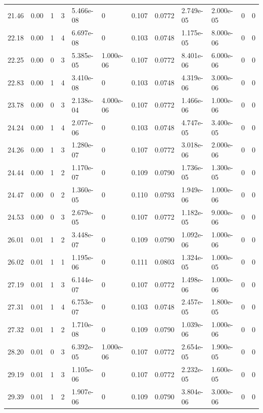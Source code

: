 \documentclass[preview]{standalone}
\begin{document}
{{{\begin{tabular}{L{1.2cm}C{1.2cm} C{0.3cm}C{0.5cm} C{1.4cm}C{1.4cm} C{1.4cm}C{1.4cm} C{1.6cm}C{1.6cm} C{1.6cm}C{1.6cm}}
  21.46  &  0.00  & 1     &  3 &  5.466e-08  & 0  &  0.107&   0.0772& 2.749e-05 & 2.000e-05   &  0 & 0  \\ 
  22.18  &  0.00  & 1     &  4 &  6.697e-08  & 0  &  0.103&   0.0748& 1.175e-05 & 8.000e-06   &  0 & 0  \\ 
  22.25  &  0.00  & 0     &  3 &  5.385e-05  & 1.000e-06  &  0.107&   0.0772& 8.401e-06 & 6.000e-06   &  0 & 0  \\ 
  22.83  &  0.00  & 1     &  4 &  3.410e-08  & 0  &  0.103&   0.0748& 4.319e-06 & 3.000e-06   &  0 & 0  \\ 
  23.78  &  0.00  & 0     &  3 &  2.138e-04  & 4.000e-06  &  0.107&   0.0772& 1.466e-06 & 1.000e-06   &  0 & 0  \\ 
  24.24  &  0.00  & 1     &  4 &  2.077e-06  & 0  &  0.103&   0.0748& 4.747e-05 & 3.400e-05   &  0 & 0  \\ 
  24.26  &  0.00  & 1     &  3 &  1.280e-07  & 0  &  0.107&   0.0772& 3.018e-06 & 2.000e-06   &  0 & 0  \\ 
  24.44  &  0.00  & 1     &  2 &  1.170e-07  & 0  &  0.109&   0.0790& 1.736e-05 & 1.300e-05   &  0 & 0  \\ 
  24.47  &  0.00  & 0     &  2 &  1.360e-05  & 0  &  0.110&   0.0793& 1.949e-06 & 1.000e-06   &  0 & 0  \\ 
  24.53  &  0.00  & 0     &  3 &  2.679e-05  & 0  &  0.107&   0.0772& 1.182e-05 & 9.000e-06   &  0 & 0  \\ 
  26.01  &  0.01  & 1     &  2 &  3.448e-07  & 0  &  0.109&   0.0790& 1.092e-06 & 1.000e-06   &  0 & 0  \\ 
  26.02  &  0.01  & 1     &  1 &  1.195e-06  & 0  &  0.111&   0.0803& 1.324e-05 & 1.000e-05   &  0 & 0  \\ 
  27.19  &  0.01  & 1     &  3 &  6.144e-07  & 0  &  0.107&   0.0772& 1.498e-06 & 1.000e-06   &  0 & 0  \\ 
  27.31  &  0.01  & 1     &  4 &  6.753e-07  & 0  &  0.103&   0.0748& 2.457e-05 & 1.800e-05   &  0 & 0  \\ 
  27.32  &  0.01  & 1     &  2 &  1.710e-08  & 0  &  0.109&   0.0790& 1.039e-06 & 1.000e-06   &  0 & 0  \\ 
  28.20  &  0.01  & 0     &  3 &  6.392e-05  & 1.000e-06  &  0.107&   0.0772& 2.654e-05 & 1.900e-05   &  0 & 0  \\ 
  29.19  &  0.01  & 1     &  3 &  1.105e-06  & 0  &  0.107&   0.0772& 2.232e-05 & 1.600e-05   &  0 & 0  \\ 
  29.39  &  0.01  & 1     &  2 &  1.907e-06  & 0  &  0.109&   0.0790& 3.804e-06 & 3.000e-06   &  0 & 0  \\ 

\end{tabular}}}}
\end{document}
